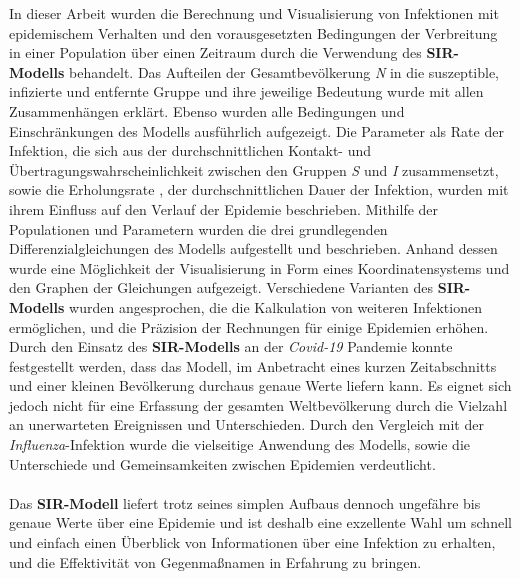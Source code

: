 \documentclass[12pt]{scrartcl} %
\begin{document}
In dieser Arbeit wurden die Berechnung und Visualisierung von Infektionen mit epidemischem Verhalten und den vorausgesetzten Bedingungen der Verbreitung in einer Population über einen Zeitraum durch die Verwendung des \textbf{SIR-Modells} behandelt. Das Aufteilen der Gesamtbevölkerung \textit{N} in die suszeptible, infizierte und entfernte Gruppe und ihre jeweilige Bedeutung wurde mit allen Zusammenhängen erklärt. Ebenso wurden alle Bedingungen und Einschränkungen des Modells ausführlich aufgezeigt.
Die Parameter \textbeta\space als Rate der Infektion, die sich aus der durchschnittlichen Kontakt- und Übertragungswahrscheinlichkeit zwischen den Gruppen \textit{S} und \textit{I} zusammensetzt, sowie die Erholungsrate \textgamma\space, der durchschnittlichen Dauer der Infektion, wurden mit ihrem Einfluss auf den Verlauf der Epidemie beschrieben. Mithilfe der Populationen und Parametern wurden die drei grundlegenden Differenzialgleichungen des Modells aufgestellt und beschrieben. Anhand dessen wurde eine Möglichkeit der Visualisierung in Form eines Koordinatensystems und den Graphen der Gleichungen aufgezeigt.
Verschiedene Varianten des \textbf{SIR-Modells} wurden angesprochen, die die Kalkulation von weiteren Infektionen ermöglichen, und die Präzision der Rechnungen für einige Epidemien erhöhen. Durch den Einsatz des \textbf{SIR-Modells} an der \textsl{Covid-19} Pandemie konnte festgestellt werden, dass das Modell, im Anbetracht eines kurzen Zeitabschnitts und einer kleinen Bevölkerung durchaus genaue Werte liefern kann. Es eignet sich jedoch nicht für eine Erfassung der gesamten Weltbevölkerung durch die Vielzahl an unerwarteten Ereignissen und Unterschieden. Durch den Vergleich mit der \textsl{Influenza}-Infektion wurde die vielseitige Anwendung des Modells, sowie die Unterschiede und Gemeinsamkeiten zwischen Epidemien verdeutlicht.\\
\\
Das \textbf{SIR-Modell} liefert trotz seines simplen Aufbaus dennoch ungefähre bis genaue Werte über eine Epidemie und ist deshalb eine exzellente Wahl um schnell und einfach einen Überblick von Informationen über eine Infektion zu erhalten, und die Effektivität von Gegenmaßnamen in Erfahrung zu bringen.


\newpage
\setlength{\bibitemsep}{\baselineskip}
\printbibliography[heading=bibintoc]
\thispagestyle{empty}
\newpage
\cleardoublepage
\listoffigures
\thispagestyle{empty}
\end{document}
